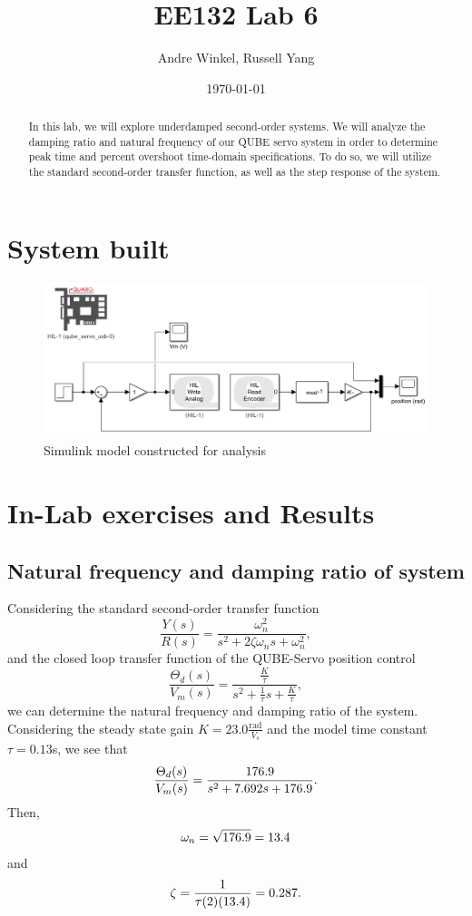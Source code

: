 \documentclass{article}
\title{EE132 Lab 6}
\author{Andre Winkel, Russell Yang}
\date{\today}
\begin{document}
\maketitle

\begin{abstract}
    In this lab, we will explore underdamped second-order systems. We will analyze the damping ratio and natural frequency of our QUBE servo system in order to determine peak time and percent overshoot time-domain specifications. To do so, we will utilize the standard second-order transfer function, as well as the step response of the system.
\end{abstract}

\section{System built} 
\begin{figure} [H]
    \centering
    \includegraphics[width=0.75\linewidth]{system.png}
    \caption{Simulink model constructed for analysis}
    \label{fig:1}
\end{figure}

\section{In-Lab exercises and Results}
\subsection{Natural frequency and damping ratio of system}
Considering the standard second-order transfer function
\begin{equation}
    \frac{Y(s)}{R(s)}=\frac{\omega_n^2}{s^2+2\zeta\omega_ns+\omega^2_n},
\end{equation}
and the closed loop transfer function of the QUBE-Servo position control
\begin{equation}
    \frac{\Theta_d(s)}{V_m(s)}=\frac{\frac{K}{\tau}}{s^2+\frac{1}{\tau}s+\frac{K}{\tau}},
\end{equation}
we can determine the natural frequency and damping ratio of the system. Considering the steady state gain $K=23.0\frac{\text{rad}}{V_s}$ and the model time constant $\tau=0.13$s, we see that
\begin{equation} \notag
    \frac{\Theta_d(s)}{V_m(s)}=\frac{176.9}{s^2+7.692s+176.9}.
\end{equation}
Then,
\begin{equation} \notag
    \omega_n=\sqrt{176.9}=13.4
\end{equation}
and
\begin{equation} \notag
    \zeta=\frac{1}{\tau(2)(13.4)}=0.287.
\end{equation}
\end{document}
